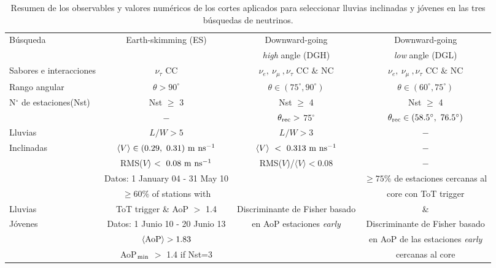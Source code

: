 \begin{table}
\begin{center}
	\renewcommand{\arraystretch}{1.4}
	\footnotesize
	\begin{tabular}{l|c|c|c}
	\hline
	Búsqueda & Earth-skimming (ES)           & Downward-going                        & Downward-going                       \\
			&                               & {\it high} angle (DGH)                & {\it low} angle (DGL)                \\
	\hline 
	Sabores e interacciones & $\nu_\tau$ CC & $\nu_e,~\nu_\mu~,\nu_\tau$ CC $\&$ NC &  $\nu_e,~\nu_\mu~,\nu_\tau$ CC $\&$ NC \\

	Rango angular & $\theta>90^\circ$             & $\theta \in (75^\circ, 90^\circ)$ & $\theta \in (60^\circ, 75^\circ)$ \\

	N$^\circ$ de estaciones(Nst) & Nst $\geq$ 3   & Nst $\geq$ 4 & Nst $\geq$ 4 \\
	\hline 
				& $-$                             & $\theta_{\rm rec}>$ 75$^{\circ}$   &   $\theta_{\rm rec}\in (58.5^\circ,~76.5^{\circ})$\\
	Lluvias    & $L/W > 5$                                         & $L/W > 3$ & $-$ \\
	Inclinadas & $\langle V\rangle\in (0.29,~0.31)~{\rm m~ns^{-1}}$ & $\langle V \rangle~<~0.313~{\rm m~ns^{-1}}$ & $-$ \\
			& RMS($V$)$~<~0.08~{\rm m~ns^{-1}}$                 & RMS($V$)/$\langle V\rangle<0.08$ & $-$ \\
	\hline 
			& Datos: 1 January 04 - 31 May 10 &                                     & $\geq 75\%$ de estaciones cercanas al   \\
			& $\geq 60\%$ of stations with  &                                      & core con ToT trigger       \\
	Lluvias     & ToT trigger \& AoP $>$ 1.4    & Discriminante de Fisher basado &                          \&        \\
	Jóvenes   & Datos: 1 Junio 10 - 20 Junio 13   & en AoP estaciones {\it early}   & Discriminante de Fisher basado  \\
			& $\langle {\rm AoP} \rangle> 1.83$  &                                 & en AoP de las estaciones {\it early} \\
			& AoP$_{\rm min}$ $>$ 1.4 if Nst=3   &                                 & cercanas al core \\
	\hline
	\end{tabular}
	\vskip -3mm
	\caption{Resumen de los observables y valores numéricos de los cortes aplicados para seleccionar lluvias inclinadas y jóvenes en las tres búsquedas de neutrinos.} 
\end{center}

\label{tab:cuts}
\end{table}